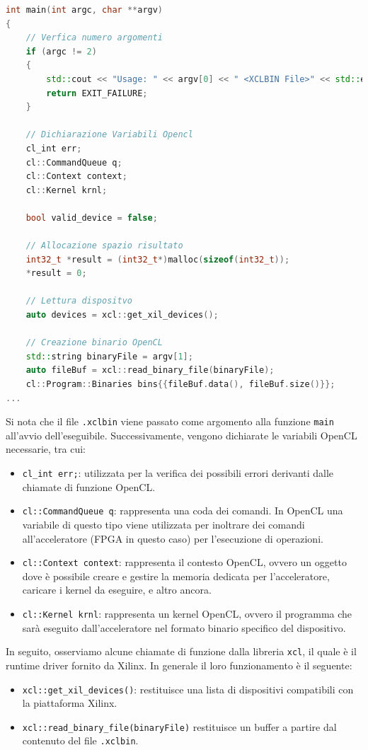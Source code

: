 \begin{lstlisting}[language=C++]
int main(int argc, char **argv)
{
	// Verfica numero argomenti
	if (argc != 2)
	{
		std::cout << "Usage: " << argv[0] << " <XCLBIN File>" << std::endl;
		return EXIT_FAILURE;
	}

	// Dichiarazione Variabili Opencl
	cl_int err;
	cl::CommandQueue q;
	cl::Context context;
	cl::Kernel krnl;
 
	bool valid_device = false;

	// Allocazione spazio risultato
	int32_t *result = (int32_t*)malloc(sizeof(int32_t));
	*result = 0;

	// Lettura dispositvo 
	auto devices = xcl::get_xil_devices();

	// Creazione binario OpenCL 
	std::string binaryFile = argv[1];
	auto fileBuf = xcl::read_binary_file(binaryFile);
	cl::Program::Binaries bins{{fileBuf.data(), fileBuf.size()}};
...
\end{lstlisting}
Si nota che il file \texttt{.xclbin} viene passato come argomento alla funzione \texttt{main} all'avvio dell'eseguibile.
Successivamente, vengono dichiarate le variabili OpenCL necessarie, tra cui:
\begin{itemize}
    \item \texttt{cl\_int err;}: utilizzata per la  verifica dei possibili errori derivanti dalle chiamate di funzione OpenCL.
    \item \texttt{cl::CommandQueue q}: rappresenta una coda dei comandi. In OpenCL una variabile di questo tipo viene utilizzata per inoltrare dei comandi all'acceleratore (FPGA in questo caso) per l'esecuzione di operazioni.
    \item \texttt{cl::Context context}: rappresenta il contesto OpenCL, ovvero un oggetto dove è possibile creare e gestire la memoria dedicata per l'acceleratore, caricare i kernel da eseguire, e  altro ancora.
    \item \texttt{cl::Kernel krnl}: rappresenta un kernel OpenCL, ovvero il programma che sarà eseguito dall'acceleratore nel formato binario specifico del dispositivo.
\end{itemize}

In seguito, osserviamo alcune chiamate di funzione dalla libreria \texttt{xcl}, il quale è il runtime driver fornito da Xilinx. 
In generale il loro funzionamento è il seguente:
\begin{itemize} 
    \item \texttt{xcl::get\_xil\_devices()}: restituisce una lista di dispositivi compatibili con la piattaforma Xilinx.
    \item \texttt{xcl::read\_binary\_file(binaryFile)} restituisce un buffer a partire dal contenuto del file \texttt{.xclbin}.
\end{itemize}

